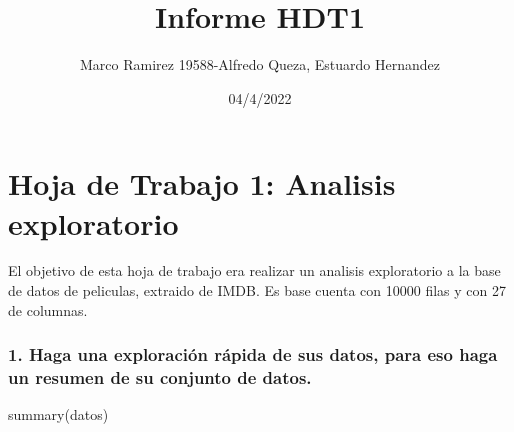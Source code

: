 \documentclass[
]{article}
\title{Informe HDT1}
\author{Marco Ramirez 19588-Alfredo Queza, Estuardo Hernandez}
\date{04/4/2022}
\newenvironment{Shaded}{\begin{snugshade}}{\end{snugshade}}
\newcommand{\FunctionTok}[1]{\textcolor[rgb]{0.00,0.00,0.00}{#1}}
\newcommand{\NormalTok}[1]{#1}
\begin{document}
\maketitle

\hypertarget{hoja-de-trabajo-1-analisis-exploratorio}{%
\section{Hoja de Trabajo 1: Analisis
exploratorio}\label{hoja-de-trabajo-1-analisis-exploratorio}}

El objetivo de esta hoja de trabajo era realizar un analisis
exploratorio a la base de datos de peliculas, extraido de IMDB. Es base
cuenta con 10000 filas y con 27 de columnas.

\hypertarget{haga-una-exploraciuxf3n-ruxe1pida-de-sus-datos-para-eso-haga-un-resumen-de-su-conjunto-de-datos.}{%
\subsubsection{1. Haga una exploración rápida de sus datos, para eso
haga un resumen de su conjunto de
datos.}\label{haga-una-exploraciuxf3n-ruxe1pida-de-sus-datos-para-eso-haga-un-resumen-de-su-conjunto-de-datos.}}

\begin{Shaded}
\begin{Highlighting}[]
\FunctionTok{summary}\NormalTok{(datos)}
\end{Highlighting}
\end{Shaded}
\end{document}
